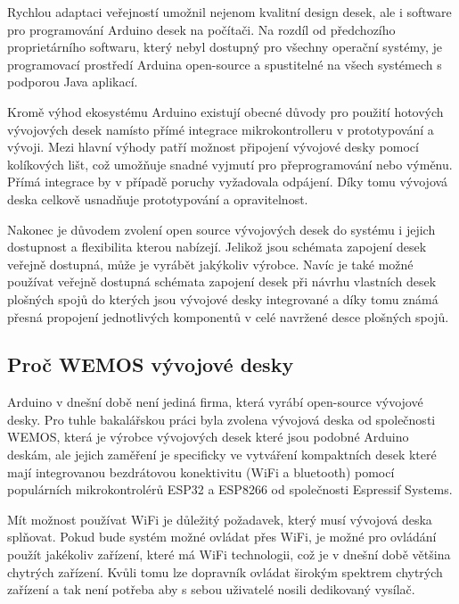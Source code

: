 Rychlou adaptaci veřejností umožnil nejenom kvalitní design desek, ale i software pro programování Arduino desek na počítači. Na rozdíl od předchozího proprietárního softwaru, který nebyl dostupný pro všechny operační systémy, je programovací prostředí Arduina open-source a spustitelné na všech systémech s podporou Java aplikací.
\cite{KnihaOArduinu}

Kromě výhod ekosystému Arduino existují obecné důvody pro použití hotových vývojových desek namísto přímé integrace mikrokontrolleru v prototypování a vývoji. Mezi hlavní výhody patří možnost připojení vývojové desky pomocí kolíkových lišt, což umožňuje snadné vyjmutí pro přeprogramování nebo výměnu. Přímá integrace by v případě poruchy vyžadovala odpájení. Díky tomu vývojová deska celkově usnadňuje prototypování a opravitelnost.

Nakonec je důvodem zvolení open source vývojových desek do systému i jejich dostupnost a flexibilita kterou nabízejí. Jelikož jsou schémata zapojení desek veřejně dostupná, může je vyrábět jakýkoliv výrobce. Navíc je také možné používat veřejně dostupná schémata zapojení desek při návrhu vlastních desek plošných spojů do kterých jsou vývojové desky integrované a díky tomu známá přesná propojení jednotlivých komponentů v celé navržené desce plošných spojů.

\subsection{Proč WEMOS vývojové desky}

Arduino v dnešní době není jediná firma, která vyrábí open-source vývojové desky. Pro tuhle bakalářskou práci byla zvolena vývojová deska od společnosti WEMOS, která je výrobce vývojových desek které jsou podobné Arduino deskám, ale jejich zaměření je specificky ve vytváření kompaktních desek které mají integrovanou bezdrátovou konektivitu (WiFi a bluetooth) pomocí populárních mikrokontrolérů ESP32 a ESP8266 od společnosti Espressif Systems.

Mít možnost používat WiFi je důležitý požadavek, který musí vývojová deska splňovat. Pokud bude systém možné ovládat přes WiFi, je možné pro ovládání použít jakékoliv zařízení, které má WiFi technologii, což je v dnešní době většina chytrých zařízení. Kvůli tomu lze dopravník ovládat širokým spektrem chytrých zařízení a tak není potřeba aby s sebou uživatelé nosili dedikovaný vysílač.

